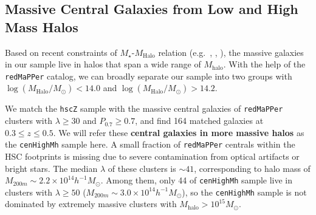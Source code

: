 \documentclass[a4paper,fleqn,usenatbib]{mnras}
\def\arcsec{{\prime\prime}}
\def\redm{\texttt{redMaPPer}}
\def\rbcg{\texttt{cenHighMh}}
\def\mhalo{{$M_{\mathrm{halo}}$}}
\def\logmh{{$\log (M_{\mathrm{Halo}}/M_{\odot})$}}
\begin{document}
 
\subsection{Massive Central Galaxies from Low and High Mass Halos}
    \label{ssec:mass_central}
    
    Based on recent constraints of $M_{\star}$-$M_{\mathrm{Halo}}$ relation 
    (e.g.\ \citealt{Leauthaud2012}, \citealt{Behroozi2013}, \citealt{Kravtsov2014}),
    the massive galaxies in our sample live in halos that span a wide range of 
    \mhalo{}.
    With the help of the \redm{} catalog, we can broadly separate our sample into two
    groups with \logmh{}$<14.0$ and \logmh{}$>14.2$.
    
    
    We match the \texttt{hscZ} sample with the massive central galaxies of 
    \redm{} clusters with $\lambda \geq 30$ and $P_{\mathrm{0.7}} \geq 0.7$,
    and find 164 matched galaxies at $0.3 \leq z \leq 0.5$.
    We will refer these \textbf{central galaxies in more massive halos} as the 
    \rbcg{} sample here.
    A small fraction of \redm{} centrals within the HSC footprints is missing  
    due to severe contamination from optical artifacts or bright stars.
    The median $\lambda$ of these clusters is $\sim 41$, corresponding to 
    halo mass of $M_{200m}\sim 2.2\times 10^{14} h^{-1} M_{\odot}$.
    Among them, only 44 of \rbcg{} sample live in clusters with $\lambda \geq 50$
    ($M_{200m} \sim 3.0\times 10^{14} h^{-1} M_{\odot}$), so the \rbcg{} sample is 
    not dominated by extremely massive clusters with \mhalo{}$>10^{15} M_{\odot}$. 
    
\end{document}
